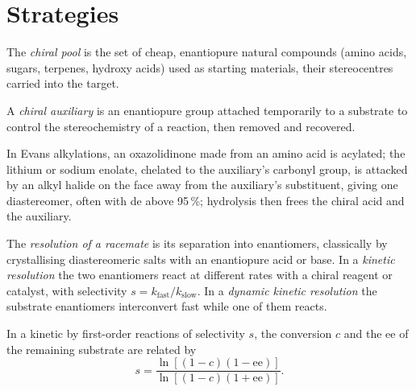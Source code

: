 \section{Strategies}

\begin{definition}\label{def:b3:asymmetric-synthesis:chiral-pool}
The \emph{chiral pool} is the set of cheap, enantiopure
natural compounds (amino acids, sugars, terpenes, hydroxy acids) used as
starting materials, their stereocentres carried into the target.
\end{definition}

\begin{definition}\label{def:b3:asymmetric-synthesis:auxiliary}
A \emph{chiral auxiliary} is an enantiopure group
attached temporarily to a substrate to control the stereochemistry of a
reaction, then removed and recovered.
\end{definition}

In Evans alkylations, an oxazolidinone made from an amino acid is acylated;
the lithium or sodium enolate, chelated to the auxiliary's carbonyl group, is
attacked by an alkyl halide on the face away from the auxiliary's substituent,
giving one diastereomer, often with de above 95\,\%; hydrolysis then frees the
chiral acid and the auxiliary.

\begin{definition}[Resolutions]\label{def:b3:asymmetric-synthesis:resolution}
The \emph{resolution of a racemate} is its
separation into enantiomers, classically by crystallising diastereomeric salts
with an enantiopure acid or base. In a \emph{kinetic resolution}
the two enantiomers react at different rates with a chiral reagent or
catalyst, with selectivity $s = k_{\mathrm{fast}}/k_{\mathrm{slow}}$. In a \emph{dynamic kinetic
resolution} the substrate enantiomers
interconvert fast while one of them reacts.
\end{definition}

\begin{theorem}\label{thm:b3:asymmetric-synthesis:kagan}
In a kinetic  by first-order reactions of selectivity $s$,
the conversion $c$ and the ee of the remaining substrate are related by
\[
  s = \frac{\ln[(1 - c)(1 - \mathrm{ee})]}{\ln[(1 - c)(1 + \mathrm{ee})]}.
\]
\end{theorem}


